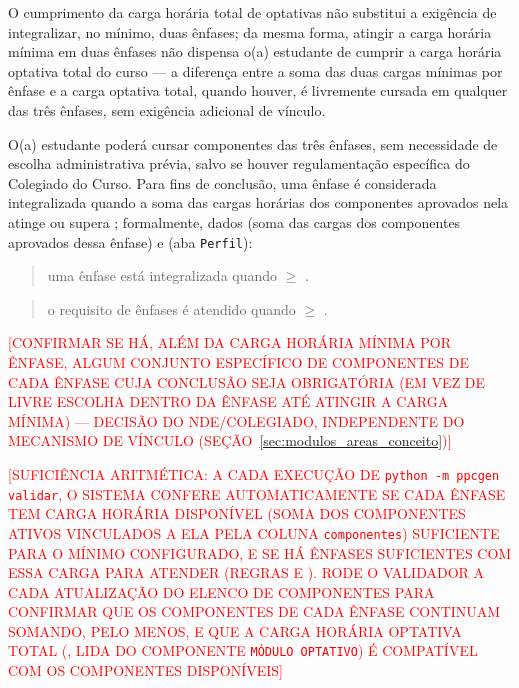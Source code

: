O cumprimento da carga horária total de optativas não substitui a exigência de integralizar, no mínimo, duas ênfases; da mesma forma, atingir a carga horária mínima em duas ênfases não dispensa o(a) estudante de cumprir a carga horária optativa total do curso — a diferença entre a soma das duas cargas mínimas por ênfase e a carga optativa total, quando houver, é livremente cursada em qualquer das três ênfases, sem exigência adicional de vínculo.

O(a) estudante poderá cursar componentes das três ênfases, sem necessidade de escolha administrativa prévia, salvo se houver regulamentação específica do Colegiado do Curso. Para fins de conclusão, uma ênfase é considerada integralizada quando a soma das cargas horárias dos componentes aprovados nela atinge ou supera ; formalmente, dados  (soma das cargas dos componentes aprovados dessa ênfase) e  (aba \texttt{Perfil}):

\begin{quote}\small
uma ênfase está integralizada quando
 $\geq$
.
\end{quote}

\begin{quote}\small
o requisito de ênfases é atendido quando
 $\geq$
.
\end{quote}

\textcolor{red}{[CONFIRMAR SE HÁ, ALÉM DA CARGA HORÁRIA MÍNIMA POR ÊNFASE, ALGUM CONJUNTO ESPECÍFICO DE COMPONENTES DE CADA ÊNFASE CUJA CONCLUSÃO SEJA OBRIGATÓRIA (EM VEZ DE LIVRE ESCOLHA DENTRO DA ÊNFASE ATÉ ATINGIR A CARGA MÍNIMA) — DECISÃO DO NDE/COLEGIADO, INDEPENDENTE DO MECANISMO DE VÍNCULO (SEÇÃO~\ref{sec:modulos_areas_conceito})]}

\textcolor{red}{[SUFICIÊNCIA ARITMÉTICA: A CADA EXECUÇÃO DE \texttt{python -m ppcgen validar}, O SISTEMA CONFERE AUTOMATICAMENTE SE CADA ÊNFASE TEM CARGA HORÁRIA DISPONÍVEL (SOMA DOS COMPONENTES ATIVOS VINCULADOS A ELA PELA COLUNA \texttt{componentes}) SUFICIENTE PARA O MÍNIMO CONFIGURADO, E SE HÁ ÊNFASES SUFICIENTES COM ESSA CARGA PARA ATENDER  (REGRAS  E ). RODE O VALIDADOR A CADA ATUALIZAÇÃO DO ELENCO DE COMPONENTES PARA CONFIRMAR QUE OS COMPONENTES DE CADA ÊNFASE CONTINUAM SOMANDO, PELO MENOS,  E QUE A CARGA HORÁRIA OPTATIVA TOTAL (\textbf{}, LIDA DO COMPONENTE \texttt{MÓDULO OPTATIVO}) É COMPATÍVEL COM OS COMPONENTES DISPONÍVEIS]}

